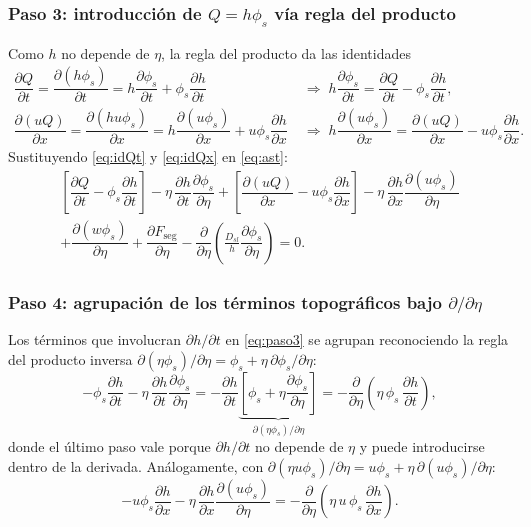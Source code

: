 \documentclass[11pt,a4paper]{article}
\newcommand{\pd}[2]{\dfrac{\partial #1}{\partial #2}}
\begin{document}
\subsubsection{Paso 3: introducción de $Q=h\phi_s$ vía regla del producto}
Como $h$ no depende de $\eta$, la regla del producto da las identidades
\begin{align}
    \pd{Q}{t} = \pd{(h\phi_s)}{t} = h\pd{\phi_s}{t} + \phi_s\pd{h}{t}
    &\;\Longrightarrow\; h\pd{\phi_s}{t} = \pd{Q}{t} - \phi_s\pd{h}{t}, \label{eq:idQt}\\
    \pd{(uQ)}{x} = \pd{(hu\phi_s)}{x} = h\pd{(u\phi_s)}{x} + u\phi_s\pd{h}{x}
    &\;\Longrightarrow\; h\pd{(u\phi_s)}{x} = \pd{(uQ)}{x} - u\phi_s\pd{h}{x}. \label{eq:idQx}
\end{align}
Sustituyendo \eqref{eq:idQt} y \eqref{eq:idQx} en \eqref{eq:ast}:
\begin{multline}
    \left[\pd{Q}{t} - \phi_s\pd{h}{t}\right] - \eta\,\pd{h}{t}\pd{\phi_s}{\eta}
    + \left[\pd{(uQ)}{x} - u\phi_s\pd{h}{x}\right] - \eta\,\pd{h}{x}\pd{(u\phi_s)}{\eta} \\
    + \pd{(w\phi_s)}{\eta} + \pd{F_{\mathrm{seg}}}{\eta}
    - \pd{}{\eta}\!\left(\frac{D_{sl}}{h}\pd{\phi_s}{\eta}\right) = 0.
    \label{eq:paso3}
\end{multline}

\subsubsection{Paso 4: agrupación de los términos topográficos bajo $\partial/\partial\eta$}
Los términos que involucran $\partial h/\partial t$ en \eqref{eq:paso3} se
agrupan reconociendo la regla del producto inversa
$\partial(\eta\phi_s)/\partial\eta = \phi_s + \eta\,\partial\phi_s/\partial\eta$:
\begin{equation}
    -\phi_s\pd{h}{t} - \eta\,\pd{h}{t}\pd{\phi_s}{\eta}
    = -\pd{h}{t}\underbrace{\left[\phi_s + \eta\pd{\phi_s}{\eta}\right]}_{\partial(\eta\phi_s)/\partial\eta}
    = -\pd{}{\eta}\!\left(\eta\,\phi_s\,\pd{h}{t}\right),
    \label{eq:grupo_t}
\end{equation}
donde el último paso vale porque $\partial h/\partial t$ no depende de
$\eta$ y puede introducirse dentro de la derivada. Análogamente, con
$\partial(\eta u\phi_s)/\partial\eta = u\phi_s + \eta\,\partial(u\phi_s)/\partial\eta$:
\begin{equation}
    -u\phi_s\pd{h}{x} - \eta\,\pd{h}{x}\pd{(u\phi_s)}{\eta}
    = -\pd{}{\eta}\!\left(\eta\,u\,\phi_s\,\pd{h}{x}\right).
    \label{eq:grupo_x}
\end{equation}
\end{document}
